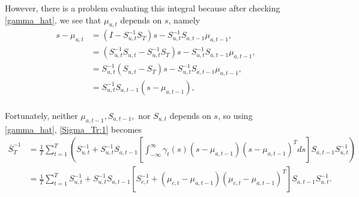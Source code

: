 \documentclass[12pt,leqno]{article}
\begin{document}
However, there is a problem evaluating this integral because after checking \eqref{gamma_hat}, we see that $\mu_{u,t}$
depends on $s$, namely  
\begin{equation}\label{s-mu_1}
  \begin{split}
    s-\mu_{u,t} &= (I - S_{u,t}^{-1}S_T)s - S_{u,t}^{-1}S_{a,t-1}\mu_{a,t-1}, \\
    &= (S_{u,t}^{-1}S_{u,t} - S_{u,t}^{-1}S_T)s - S_{u,t}^{-1}S_{a,t-1}\mu_{a,t-1}, \\
    &= S_{u,t}^{-1}(S_{u,t} - S_T)s - S_{u,t}^{-1}S_{a,t-1}\mu_{a,t-1}, \\
    &= S_{u,t}^{-1}S_{a,t-1}(s - \mu_{a,t-1}),\\
  \end{split}
\end{equation}


Fortunately, neither $\mu_{a,t-1},S_{a,t-1},$ nor $S_{u,t}$ depends on $s$,
so using \eqref{gamma_hat}, \eqref{Sigma_Tr:1} becomes
\begin{equation}\label{S_Tr:2}
  \begin{split}
  \overline{S}_T^{-1} &=\frac{1}{T}\sum_{t=1}^T\left(S_{u,t}^{-1} +S_{u,t}^{-1}S_{a,t-1}
  \left[\int_{-\infty}^{\infty}\gamma_t(s)(s-\mu_{a,t-1})(s-\mu_{a,t-1})^Tds\right]S_{a,t-1}S_{u,t}^{-1}\right)\\
   &=\frac{1}{T}\sum_{t=1}^TS_{u,t}^{-1}+S_{u,t}^{-1}S_{a,t-1}
   [S_{c,t}^{-1}+(\mu_{c,t}-\mu_{a,t-1})(\mu_{c,t}-\mu_{a,t-1})^T]S_{a,t-1}S_{u,t}^{-1}.
  \end{split}
\end{equation}
\end{document}
